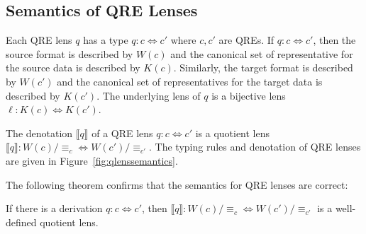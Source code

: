\documentclass{svproc}
\newcommand{\eqrel}[1]{\ensuremath{\equiv_{#1}}}
\begin{document}
\subsection{Semantics of QRE Lenses}

Each QRE lens $q$ has a type $q : c \Leftrightarrow c'$ where $c, c'$ are QREs.
If $q : c \Leftrightarrow c'$, then the source format is described by $W(c)$ and
the canonical set of representative for the source data is described by $K(c)$.
Similarly, the target format is described by $W(c')$ and the canonical set of
representatives for the target data is described by $K(c')$. The underlying lens
of $q$ is a bijective lens $\ell : K(c) \Leftrightarrow K(c')$.

The denotation $\llbracket q \rrbracket$ of a QRE lens $q:c \Leftrightarrow c'$
is a quotient lens $\llbracket q \rrbracket : W(c)/{\eqrel{c}}
\Longleftrightarrow W(c')/{\eqrel{c'}}$. The typing rules and denotation of QRE
lenses are given in Figure~\ref{fig:qlenssemantics}.

The following theorem confirms that the semantics for QRE lenses are correct:
\begin{theorem}
If there is a derivation $q : c \Leftrightarrow c'$, then $\llbracket q
\rrbracket : W(c)/{\eqrel{c}} \Leftrightarrow W(c')/{\eqrel{c'}}$ is a
well-defined quotient lens.
\end{theorem}
\end{document}
